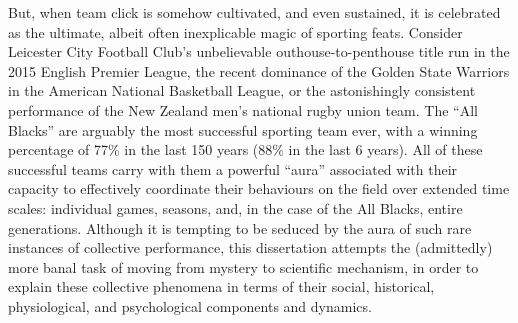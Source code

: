 But, when team click is somehow cultivated, and even sustained, it is celebrated as the ultimate, albeit often inexplicable magic of sporting feats. Consider Leicester City Football Club's unbelievable outhouse-to-penthouse title run in the 2015 English Premier League, the recent dominance of the Golden State Warriors in the American National Basketball League, or the astonishingly consistent performance of the New Zealand men's national rugby union team.  The ``All Blacks'' are arguably the most successful sporting team ever, with a winning percentage of 77\% in the last 150 years (88\% in the last 6 years).  All of these successful teams carry with them a powerful ``aura'' associated with their capacity to effectively coordinate their behaviours on the field over extended time scales: individual games, seasons, and, in the case of the All Blacks, entire generations.  Although it is tempting to be seduced by the aura of such rare instances of collective performance, this dissertation attempts the (admittedly) more banal task of moving from mystery to scientific mechanism, in order to explain these collective phenomena in terms of their social, historical, physiological, and psychological components and dynamics.

